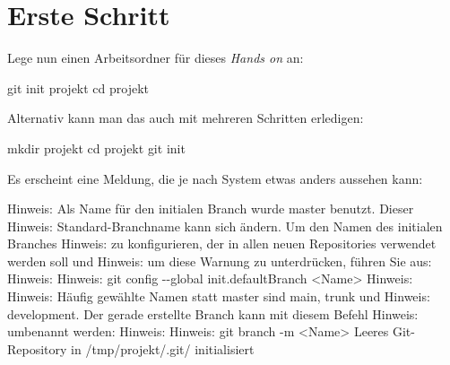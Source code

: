 \documentclass[
  letterpaper,
  DIV=11]{scrreprt}
\newenvironment{Shaded}{\begin{snugshade}}{\end{snugshade}}
\newcommand{\AttributeTok}[1]{\textcolor[rgb]{0.40,0.45,0.13}{#1}}
\newcommand{\BuiltInTok}[1]{\textcolor[rgb]{0.00,0.23,0.31}{#1}}
\newcommand{\ExtensionTok}[1]{\textcolor[rgb]{0.00,0.23,0.31}{#1}}
\newcommand{\FunctionTok}[1]{\textcolor[rgb]{0.28,0.35,0.67}{#1}}
\newcommand{\NormalTok}[1]{\textcolor[rgb]{0.00,0.23,0.31}{#1}}
\newcommand{\OperatorTok}[1]{\textcolor[rgb]{0.37,0.37,0.37}{#1}}
\newcommand{\StringTok}[1]{\textcolor[rgb]{0.13,0.47,0.30}{#1}}
\begin{document}
\section{Erste Schritt}\label{erste-schritt}

Lege nun einen Arbeitsordner für dieses \emph{Hands on} an:

\begin{Shaded}
\begin{Highlighting}[]
\FunctionTok{git}\NormalTok{ init projekt }
\BuiltInTok{cd}\NormalTok{ projekt }
\end{Highlighting}
\end{Shaded}

Alternativ kann man das auch mit mehreren Schritten erledigen:

\begin{Shaded}
\begin{Highlighting}[]
\FunctionTok{mkdir}\NormalTok{ projekt }
\BuiltInTok{cd}\NormalTok{ projekt }
\FunctionTok{git}\NormalTok{ init }
\end{Highlighting}
\end{Shaded}

Es erscheint eine Meldung, die je nach System etwas anders aussehen
kann:

\begin{Shaded}
\begin{Highlighting}[]
\ExtensionTok{Hinweis:}\NormalTok{ Als Name für den initialen Branch wurde }\StringTok{\textquotesingle{}master\textquotesingle{}}\NormalTok{ benutzt. Dieser}
\ExtensionTok{Hinweis:}\NormalTok{ Standard{-}Branchname kann sich ändern. Um den Namen des initialen Branches}
\ExtensionTok{Hinweis:}\NormalTok{ zu konfigurieren, der in allen neuen Repositories verwendet werden soll und}
\ExtensionTok{Hinweis:}\NormalTok{ um diese Warnung zu unterdrücken, führen Sie aus:}
\ExtensionTok{Hinweis:} 
\ExtensionTok{Hinweis:}\NormalTok{    git config }\AttributeTok{{-}{-}global}\NormalTok{ init.defaultBranch }\OperatorTok{\textless{}}\NormalTok{Name}\OperatorTok{\textgreater{}}
\ExtensionTok{Hinweis:} 
\ExtensionTok{Hinweis:}\NormalTok{ Häufig gewählte Namen statt }\StringTok{\textquotesingle{}master\textquotesingle{}}\NormalTok{ sind }\StringTok{\textquotesingle{}main\textquotesingle{}}\NormalTok{, }\StringTok{\textquotesingle{}trunk\textquotesingle{}}\NormalTok{ und}
\ExtensionTok{Hinweis:} \StringTok{\textquotesingle{}development\textquotesingle{}}\NormalTok{. Der gerade erstellte Branch kann mit diesem Befehl}
\ExtensionTok{Hinweis:}\NormalTok{ umbenannt werden:}
\ExtensionTok{Hinweis:} 
\ExtensionTok{Hinweis:}\NormalTok{    git branch }\AttributeTok{{-}m} \OperatorTok{\textless{}}\NormalTok{Name}\OperatorTok{\textgreater{}}
\ExtensionTok{Leeres}\NormalTok{ Git{-}Repository in /tmp/projekt/.git/ initialisiert}
\end{Highlighting}
\end{Shaded}
\end{document}
